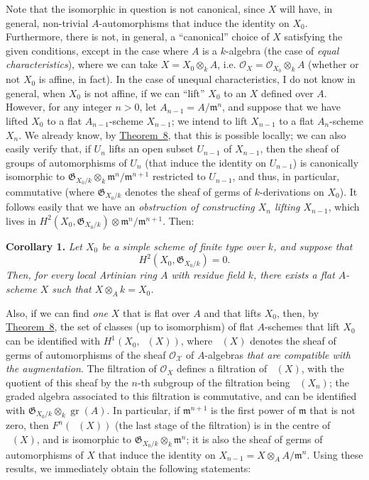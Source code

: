 \documentclass{article}
\newenvironment{itenv}[1]
  {\phantomsection\par\medskip\noindent\textbf{#1.}\itshape}
  {\par\medskip}
\newcommand{\scr}[1]{{\mathscr{#1}}}
\newcommand{\fk}{\mathfrak}
\DeclareMathOperator{\Aut}{Aut}
\DeclareMathOperator{\shAut}{\underline{\Aut}}
\DeclareMathOperator{\gr}{gr}
\newcommand{\oldpage}[1]{\marginpar{\footnotesize$\Big\vert$ \textit{p.~#1}}}
\begin{document}
Note that the isomorphic in question is not canonical, since $X$ will have, in general, non-trivial $A$-automorphisms that induce the identity on $X_0$.
Furthermore, there is not, in general, a ``canonical'' choice of $X$ satisfying the given conditions, except in the case where $A$ is a $k$-algebra (the case of \emph{equal characteristics}), where we can take $X=X_0\otimes_k A$, i.e. $\scr{O}_X=\scr{O}_{X_0}\otimes_k A$ (whether or not $X_0$ is affine, in fact).
In the case of unequal characteristics, I do not know in general, when $X_0$ is not affine, if we can ``lift'' $X_0$ to an $X$ defined over $A$.
However, for any integer $n>0$, let $A_{n-1}=A/\fk{m}^n$, and suppose that we have lifted $X_0$ to a flat $A_{n-1}$-scheme $X_{n-1}$;
we intend to lift $X_{n-1}$ to a flat $A_n$-scheme $X_n$.
We already know, by \hyperref[theorem8]{Theorem~8}, that this is possible locally;
we can also easily verify that, if $U_n$ lifts an open subset $U_{n-1}$ of $X_{n-1}$, then the sheaf of groups of automorphisms of $U_n$ (that induce the identity on $U_{n-1}$) is canonically isomorphic to $\fk{G}_{X_0/k}\otimes_k\fk{m}^n/\fk{m}^{n+1}$ restricted to $U_{n-1}$, and thus, in particular, commutative (where $\fk{G}_{X_0/k}$ denotes the sheaf of germs of $k$-derivations on $X_0$).
It follows easily that we have an \emph{obstruction of constructing $X_n$ lifting $X_{n-1}$}, which lives in $H^2(X_0,\fk{G}_{X_0/k})\otimes\fk{m}^n/\fk{m}^{n+1}$.
Then:

\begin{itenv}{Corollary 1}
\label{theorem8corollary1}
  Let $X_0$ be a simple scheme of finite type over $k$, and suppose that
\oldpage{182-13}
  \[H^2(X_0,\fk{G}_{X_0/k})=0.\]
  Then, for every local Artinian ring $A$ with residue field $k$, there exists a flat $A$-scheme $X$ such that $X\otimes_A k=X_0$.
\end{itenv}

Also, if we can find \emph{one} $X$ that is flat over $A$ and that lifts $X_0$, then, by \hyperref[theorem8]{Theorem~8}, the set of classes (up to isomorphism) of flat $A$-schemes that lift $X_0$ can be identified with $H^1(X_0,\shAut(X))$, where $\shAut(X)$ denotes the sheaf of germs of automorphisms of the sheaf $\scr{O_X}$ of $A$-algebras \emph{that are compatible with the augmentation}.
The filtration of $\scr{O}_X$ defines a filtration of $\shAut(X)$, with the quotient of this sheaf by the $n$-th subgroup of the filtration being $\shAut(X_n)$;
the graded algebra associated to this filtration is commutative, and can be identified with $\fk{G}_{X_0/k}\otimes_k\gr(A)$.
In particular, if $\fk{m}^{n+1}$ is the first power of $\fk{m}$ that is not zero, then $F^n(\shAut(X))$ (the last stage of the filtration) is in the centre of $\shAut(X)$, and is isomorphic to $\fk{G}_{X_0/k}\otimes_k\fk{m}^n$;
it is also the sheaf of germs of automorphisms of $X$ that induce the identity on $X_{n-1}=X\otimes_A A/\fk{m}^n$.
Using these results, we immediately obtain the following statements:
\end{document}
